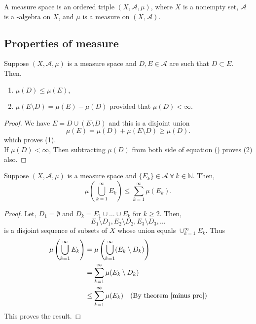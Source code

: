 \begin{definition}
    A measure space is an ordered triple $(X,\mathcal{A},\mu)$, where $X$ is a nonempty set,  $\mathcal{A}$ is a \sig-algebra on $X$, and  $\mu$ is a measure on  $(X,\mathcal{A})$.
\end{definition}

\subsection{Properties of measure}

\begin{theorem}
    \label{minus pro}
    Suppose $(X,\mathcal{A},\mu)$ is a measure space and $D,E\in\mathcal{A}$ are such that $D\subset E$. Then,
    \begin{enumerate}
        \item $\mu(D)\le \mu(E)$,
        \item $\mu(E\setminus D)=\mu(E)-\mu(D)$ provided that $\mu(D)<\infty$.
    \end{enumerate}
\end{theorem}
\begin{proof}
    We have $E=D\cup(E\setminus D)$ and this is a disjoint union
    \begin{equation}
        \label{muE}
        \mu(E) = \mu(D) + \mu(E\setminus D) \ge \mu(D).
    \end{equation}
    which proves (1).\\
    If $\mu(D)<\infty$, Then subtracting $\mu(D)$ from both side of equation () proves (2) also.
\end{proof}

\begin{theorem}[]
    Suppose $(X,\mathcal{A},\mu)$ is a measure space and $\{E_k\}\in\mathcal{A}\ \forall\ k\in \mathds{N}$. Then,
    \[
        \mu \left( \bigcup_{k=1}^{\infty}E_k \right)\le \sum_{k=1}^{\infty}\mu(E_k). 
    \]
\end{theorem}
\begin{proof}
    Let, $D_1=\emptyset$ and $D_k=E_1\cup \ldots\cup E_k$ for $k\ge 2$. Then,
    \[
        E_1\setminus D_1,E_2\setminus D_2,E_3\setminus D_3,\ldots
    \]
    is a disjoint sequence of subsets of $X$ whose union equals  $\cup_{k=1}^{\infty}E_k$. Thus
    \begin{align*}
        \mu\left( \bigcup_{k=1}^{\infty}E_k \right) &= \mu\left( \bigcup_{k=1}^{\infty}(E_k\setminus D_k) \right)\\
                                                    &= \sum_{k=1}^{\infty} \mu(E_k\setminus D_k)\\
                                                    &\le \sum_{k=1}^{\infty}\mu(E_k) \ \ \text{ (By theorem \refeq{minus pro})}
    \end{align*}
    This proves the result.
\end{proof}

